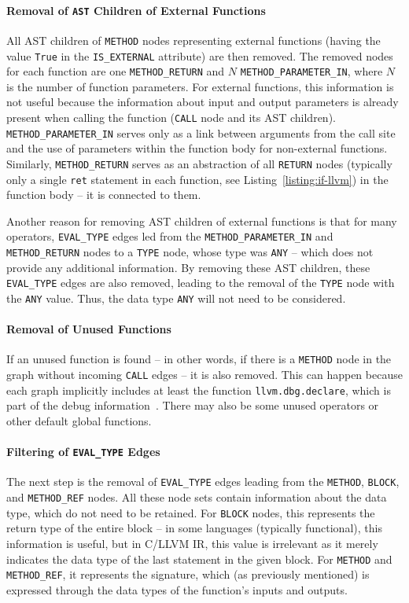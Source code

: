 \paragraph{Removal of \texttt{AST} Children of External Functions}
All AST children of \texttt{METHOD} nodes representing external functions (having the value \texttt{True} in the \texttt{IS\_EXTERNAL} attribute) are then removed. The removed nodes for each function are one \texttt{METHOD\_RETURN} and $N$ \texttt{METHOD\_PARAMETER\_IN}, where $N$ is the number of function parameters. For external functions, this information is not useful because the information about input and output parameters is already present when calling the function (\texttt{CALL} node and its AST children). \texttt{METHOD\_PARAMETER\_IN} serves only as a link between arguments from the call site and the use of parameters within the function body for non-external functions. Similarly, \texttt{METHOD\_RETURN} serves as an abstraction of all \texttt{RETURN} nodes (typically only a single \texttt{ret} statement in each function, see Listing~\ref{listing:if-llvm}) in the function body -- it is connected to them. 

Another reason for removing AST children of external functions is that for many operators, \texttt{EVAL\_TYPE} edges led from the \texttt{METHOD\_PARAMETER\_IN} and \texttt{METHOD\_RETURN} nodes to a \texttt{TYPE} node, whose type was \texttt{ANY} -- which does not provide any additional information. By removing these AST children, these \texttt{EVAL\_TYPE} edges are also removed, leading to the removal of the \texttt{TYPE} node with the \texttt{ANY} value. Thus, the data type \texttt{ANY} will not need to be considered.

\paragraph{Removal of Unused Functions}
If an unused function is found -- in other words, if there is a \texttt{METHOD} node in the graph without incoming \texttt{CALL} edges -- it is also removed. This can happen because each graph implicitly includes at least the function \texttt{llvm.dbg.declare}, which is part of the debug information~\cite{LLVM-IR}. There may also be some unused operators or other default global functions.

\paragraph{Filtering of \texttt{EVAL\_TYPE} Edges}
The next step is the removal of \texttt{EVAL\_TYPE} edges leading from the \texttt{METHOD}, \texttt{BLOCK}, and \texttt{METHOD\_REF} nodes. All these node sets contain information about the data type, which do not need to be retained. For \texttt{BLOCK} nodes, this represents the return type of the entire block -- in some languages (typically functional), this information is useful, but in C/LLVM IR, this value is irrelevant as it merely indicates the data type of the last statement in the given block. For \texttt{METHOD} and \texttt{METHOD\_REF}, it represents the signature, which (as previously mentioned) is expressed through the data types of the function's inputs and outputs.

